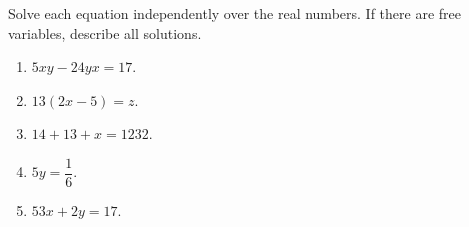 Solve each equation independently over the real numbers. If there are free variables, describe all solutions.
\begin{enumerate}
\item $5xy-24yx=17$.
\item $13(2x-5)=z$.
\item $14+13+x=1232$.
\item $5y=\dfrac{1}{6}$.
\item $53x+2y=17$.
\end{enumerate}
